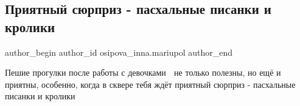  
 
 
 
 

\subsection{Приятный сюрприз - пасхальные писанки и кролики}
\label{sec:26_04_2019.fb.osipova_inna.mariupol.1.prijatnyj_sjurpriz_pysanky_kroliki}

\ifcmt
 author_begin
   author_id osipova_inna.mariupol
 author_end
\fi

Пешие прогулки после работы с девочками 💃 не только полезны, но ещё и приятны,
особенно, когда в сквере тебя ждёт приятный сюрприз - пасхальные писанки и
кролики 🐰 💖🧡💙💜🇺🇦

